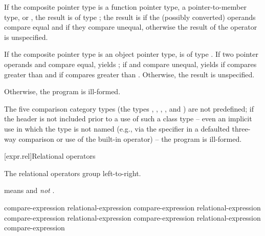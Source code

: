 \pnum
If the composite pointer type is
a function pointer type,
a pointer-to-member type, or
,
the result is of type ;
the result is
if the (possibly converted) operands compare equal
and
if they compare unequal,
otherwise the result of the operator is unspecified.

\pnum
If the composite pointer type is an object pointer type,
 is of type .
If two pointer operands  and  compare equal,
 yields ;
if  and  compare unequal,
 yields
if  compares greater than 
and
if  compares greater than .
Otherwise, the result is unspecified.

\pnum
Otherwise, the program is ill-formed.

\pnum
The five comparison category types
(the types
,
,
,
, and
)
are not predefined;
if the header
is not included prior to a use of such a class type --
even an implicit use in which the type is not named
(e.g., via the  specifier
in a defaulted three-way comparison
or use of the built-in operator) -- the program is ill-formed.

[expr.rel]{Relational operators}%
%

\pnum
The relational operators group left-to-right.
\begin{example}
 means  and \emph{not}
.
\end{example}

%
%
%
%
%
%
%
%
%
\begin{bnf}
\br
    compare-expression\br
    relational-expression \terminal{<} compare-expression\br
    relational-expression \terminal{>} compare-expression\br
    relational-expression \terminal{<=} compare-expression\br
    relational-expression \terminal{>=} compare-expression
\end{bnf}

